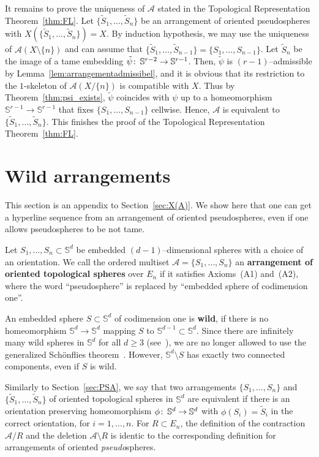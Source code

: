 \documentclass[a4paper]{amsart}
\def\co{\colon\thinspace}
\newcommand{\begriff}[1]{\textbf{#1}}
\newcommand{\p}{\mathbb S}
\theoremstyle{definition}
\theoremstyle{remark}
\begin{document}
It remains to prove the uniqueness of $\mathcal A$ stated in the
Topological Representation Theorem~\ref{thm:FL}.  Let $\{\tilde
S_1,\dots, \tilde S_n\}$ be an arrangement of oriented pseudospheres
with $X(\{\tilde S_1,\dots, \tilde S_n\})=X$. By induction hypothesis,
we may use the uniqueness of $\mathcal A(X\setminus \{n\})$ and can
assume that $\{\tilde S_1,\dots,\tilde S_{n-1}\} = \{S_1,\dots,
S_{n-1}\}$. Let $\tilde S_n$ be the image of a tame embedding
$\tilde\psi\co\p^{r-2}\to \p^{r-1}$.  Then, $\tilde\psi$ is
$(r-1)$--admissible by Lemma~\ref{lem:arrangementadmissibel}, and it is
obvious that its restriction to the $1$-skeleton of $\mathcal
A(X/\{n\})$ is compatible with $X$.  Thus by Theorem~\ref{thm:psi_exists},
$\tilde \psi$ coincides with $\psi$ up to a homeomorphism $\p^{r-1}\to
\p^{r-1}$ that fixes $\{S_1,\dots,S_{n-1}\}$ cellwise.  Hence, $\mathcal A$
is equivalent to $\{\tilde S_1,\dots, \tilde S_n\}$.  This finishes the
proof of the Topological Representation Theorem~\ref{thm:FL}.





\section{Wild arrangements}
\label{sec:wild}

This section is an appendix to Section~\ref{sec:X(A)}. We show here that
one can get a hyperline sequence from an arrangement of oriented
pseudospheres, even if one allows pseudospheres to be not tame.

Let $S_1,\dots, S_n\subset \p^d$ be embedded $(d-1)$--dimensional
spheres with a choice of an orientation.  We call the ordered multiset
$\mathcal A = \{S_1,\dots, S_n\}$ an \begriff{arrangement of oriented
  topological spheres} over $E_n$ if it satisfies Axioms~(A1) and~(A2),
where the word ``pseudosphere'' is replaced by ``embedded sphere of
codimension one''.

An embedded sphere $S\subset \p^d$ of codimension one is \begriff{wild},
if there is no homeomorphism $\p^d\to \p^d$ mapping $S$ to
$\p^{d-1}\subset \p^d$.  Since there are infinitely many wild spheres in
$\p^d$ for all $d\ge 3$ (see~\cite{rolfsen}), we are no longer allowed
to use the generalized Sch\"onflies theorem~\cite{brown}.  However,
$\p^d\setminus S$ has exactly two connected components, even if $S$ is
wild. 

Similarly to Section~\ref{sec:PSA}, we say that two arrangements
$\{S_1,\dots, S_n\}$ and $\{\tilde S_1,\dots, \tilde S_n\}$ of oriented
topological spheres in $\p^d$ are equivalent if there is an orientation
preserving homeomorphism $\phi\co \p^d \to \p^d$ with $\phi(S_i)=\tilde
S_i$ in the correct orientation, for $i=1,\dots, n$.
%
For $R\subset E_n$, the definition of the contraction $\mathcal A/R$ and
the deletion $\mathcal A\setminus R$ is identic to the corresponding
definition for arrangements of oriented \emph{pseudo}spheres.
\end{document}
